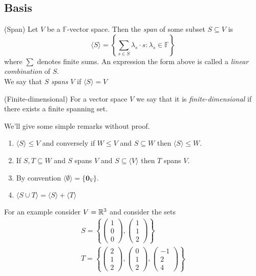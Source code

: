 \documentclass{article}
\newcommand{\F}{\mathbb{F}}
\begin{document}
\subsection{Basis}
\begin{definition}
	(Span) Let $ V $ be a $ \F $-vector space. Then the \textit{span} of some subset $ S\subseteq V $ is
	\[
		\langle S\rangle = \left\{\sum_{s\in S}\lambda_s\cdot s: \lambda_s\in \F\right\}
	\]
	where $ \sum $ denotes finite sums. An expression the form above is called a \textit{linear combination} of $ S $.\\
	We say that $ S $ \textit{spans} $ V $ if $ \langle S\rangle =V $
\end{definition}
\begin{definition}
	(Finite-dimensional) For a vector space $ V $ we say that it is \textit{finite-dimensional} if there exists a finite spanning set.
\end{definition}
We'll give some simple remarks without proof.
  \begin{enumerate}
	  \item $ \langle S \rangle\le V $ and conversely if $ W\le V $ and $ S\subseteq W $ then $ \langle S\rangle \le W $.
	  \item If $ S,T\subseteq W $ and $ S $ spans $ V $ and $ S\subseteq \langle V\rangle $ then $ T $ spans $ V $.
	  \item By convention $ \langle\emptyset\rangle =\{\mathbf 0_V\} $.
	  \item $ \langle S\cup T\rangle = \langle S\rangle + \langle T\rangle $
  \end{enumerate}
For an example consider $ V=\mathbb{R}^3 $ and consider the sets
\begin{align*}
  S=\left\{\begin{pmatrix}
    1\\0\\0
  \end{pmatrix},\begin{pmatrix}
    1\\1\\2
\end{pmatrix}\right\}\\
T=\left\{\begin{pmatrix}
  2\\1\\2
\end{pmatrix},\begin{pmatrix}
  0\\1\\2
\end{pmatrix},\begin{pmatrix}
  -1\\2\\4
\end{pmatrix}\right\}
\end{align*}
\end{document}
